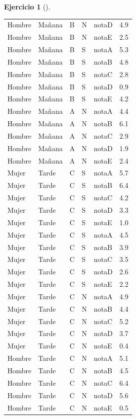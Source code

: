 \documentclass[
  a4paper,
]{scrreport}
\theoremstyle{definition}
\newtheorem{exercise}{Ejercicio}[chapter]
\theoremstyle{remark}
\begin{document}
\begin{exercise}[]
\begin{enumerate}
\begin{tcolorbox}
\begin{longtable}[]{@{}lllllr@{}}
  Hombre & Mañana & B & N & notaD & 4.9 \\
  Hombre & Mañana & B & N & notaE & 2.5 \\
  Hombre & Mañana & B & S & notaA & 5.3 \\
  Hombre & Mañana & B & S & notaB & 4.8 \\
  Hombre & Mañana & B & S & notaC & 2.8 \\
  Hombre & Mañana & B & S & notaD & 0.9 \\
  Hombre & Mañana & B & S & notaE & 4.2 \\
  Hombre & Mañana & A & N & notaA & 4.4 \\
  Hombre & Mañana & A & N & notaB & 6.1 \\
  Hombre & Mañana & A & N & notaC & 2.9 \\
  Hombre & Mañana & A & N & notaD & 1.9 \\
  Hombre & Mañana & A & N & notaE & 2.4 \\
  Mujer & Tarde & C & S & notaA & 5.7 \\
  Mujer & Tarde & C & S & notaB & 6.4 \\
  Mujer & Tarde & C & S & notaC & 4.2 \\
  Mujer & Tarde & C & S & notaD & 3.3 \\
  Mujer & Tarde & C & S & notaE & 1.0 \\
  Mujer & Tarde & C & S & notaA & 4.5 \\
  Mujer & Tarde & C & S & notaB & 3.9 \\
  Mujer & Tarde & C & S & notaC & 3.5 \\
  Mujer & Tarde & C & S & notaD & 2.6 \\
  Mujer & Tarde & C & S & notaE & 2.2 \\
  Mujer & Tarde & C & N & notaA & 4.9 \\
  Mujer & Tarde & C & N & notaB & 4.4 \\
  Mujer & Tarde & C & N & notaC & 5.2 \\
  Mujer & Tarde & C & N & notaD & 3.7 \\
  Mujer & Tarde & C & N & notaE & 0.4 \\
  Hombre & Tarde & C & N & notaA & 5.1 \\
  Hombre & Tarde & C & N & notaB & 4.5 \\
  Hombre & Tarde & C & N & notaC & 6.4 \\
  Hombre & Tarde & C & N & notaD & 5.6 \\
  Hombre & Tarde & C & N & notaE & 0.5 \\

\end{longtable}
\end{tcolorbox}
\end{enumerate}
\end{exercise}
\end{document}
